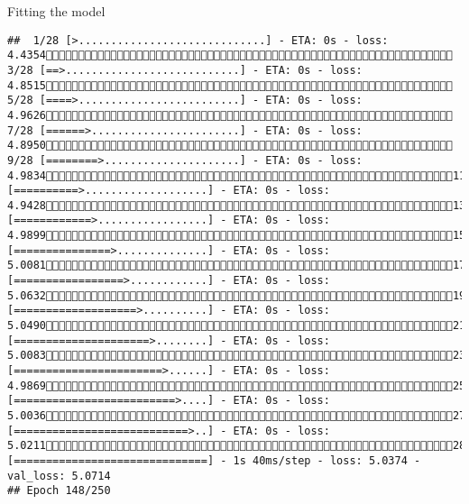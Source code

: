 \documentclass[
  ignorenonframetext,
]{beamer}
\begin{document}
\begin{frame}[fragile]{Fitting the model}
\begin{verbatim}
##  1/28 [>.............................] - ETA: 0s - loss: 4.4354 3/28 [==>...........................] - ETA: 0s - loss: 4.8515 5/28 [====>.........................] - ETA: 0s - loss: 4.9626 7/28 [======>.......................] - ETA: 0s - loss: 4.8950 9/28 [========>.....................] - ETA: 0s - loss: 4.983411/28 [==========>...................] - ETA: 0s - loss: 4.942813/28 [============>.................] - ETA: 0s - loss: 4.989915/28 [===============>..............] - ETA: 0s - loss: 5.008117/28 [=================>............] - ETA: 0s - loss: 5.063219/28 [===================>..........] - ETA: 0s - loss: 5.049021/28 [=====================>........] - ETA: 0s - loss: 5.008323/28 [=======================>......] - ETA: 0s - loss: 4.986925/28 [=========================>....] - ETA: 0s - loss: 5.003627/28 [===========================>..] - ETA: 0s - loss: 5.021128/28 [==============================] - 1s 40ms/step - loss: 5.0374 - val_loss: 5.0714
## Epoch 148/250

\end{verbatim}
\end{frame}
\end{document}
